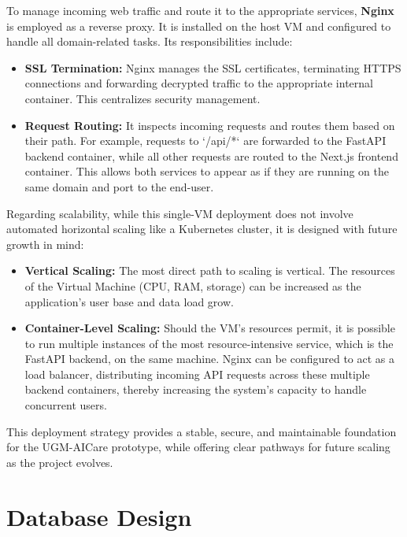 To manage incoming web traffic and route it to the appropriate services, \textbf{Nginx} is employed as a reverse proxy. It is installed on the host VM and configured to handle all domain-related tasks. Its responsibilities include:
\begin{itemize}
    \item \textbf{SSL Termination:} Nginx manages the SSL certificates, terminating HTTPS connections and forwarding decrypted traffic to the appropriate internal container. This centralizes security management.
    \item \textbf{Request Routing:} It inspects incoming requests and routes them based on their path. For example, requests to `/api/*` are forwarded to the FastAPI backend container, while all other requests are routed to the Next.js frontend container. This allows both services to appear as if they are running on the same domain and port to the end-user.
\end{itemize}

Regarding scalability, while this single-VM deployment does not involve automated horizontal scaling like a Kubernetes cluster, it is designed with future growth in mind:
\begin{itemize}
    \item \textbf{Vertical Scaling:} The most direct path to scaling is vertical. The resources of the Virtual Machine (CPU, RAM, storage) can be increased as the application's user base and data load grow.
    \item \textbf{Container-Level Scaling:} Should the VM's resources permit, it is possible to run multiple instances of the most resource-intensive service, which is the FastAPI backend, on the same machine. Nginx can be configured to act as a load balancer, distributing incoming API requests across these multiple backend containers, thereby increasing the system's capacity to handle concurrent users.
\end{itemize}

This deployment strategy provides a stable, secure, and maintainable foundation for the UGM-AICare prototype, while offering clear pathways for future scaling as the project evolves.


\section{Database Design}
\label{sec:database_design}

